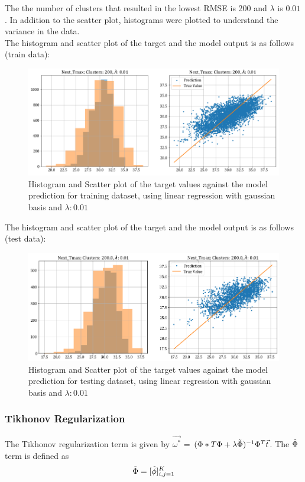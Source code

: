 \documentclass[12pt,a4paper]{article}
\newcommand{\noi}{\noindent}
\begin{document}
\noi
The the number of clusters that resulted in the lowest RMSE is 200 and $\lambda$ is $0.01$. In addition to the scatter plot, histograms were plotted to understand the variance in the data.\\

\noi
The histogram and scatter plot of the target and the model output is as follows (train data):
\begin{figure}[H]
     \centering
     \includegraphics[scale=0.49]{images/t3_d3/reg/T_max_nclu_200_lambda_0.01.png}
     \caption{Histogram and Scatter plot of the target values against the model prediction for training dataset, using linear regression with gaussian basis and $\lambda: 0.01$}
\end{figure}

\noi
The histogram and scatter plot of the target and the model output is as follows (test data):
\begin{figure}[H]
    \centering
    \includegraphics[scale=0.49]{images/t3_d3/reg/tmax_test.png}
    \caption{Histogram and Scatter plot of the target values against the model prediction for testing dataset, using linear regression with gaussian basis and $\lambda: 0.01$}
\end{figure}

\subsubsection{Tikhonov Regularization} 
The Tikhonov regularization term is given by $\vec{\omega^*}$ = $(\Phi*T\Phi + \lambda \Tilde{\Phi})^{-1} \Phi^T \vec{t}$. The $\Tilde{\Phi}$ term is defined as 
\begin{equation}
    \Tilde{\Phi} = [\Tilde{\phi}]_{i,j = 1}^{K}
\end{equation}
\end{document}
